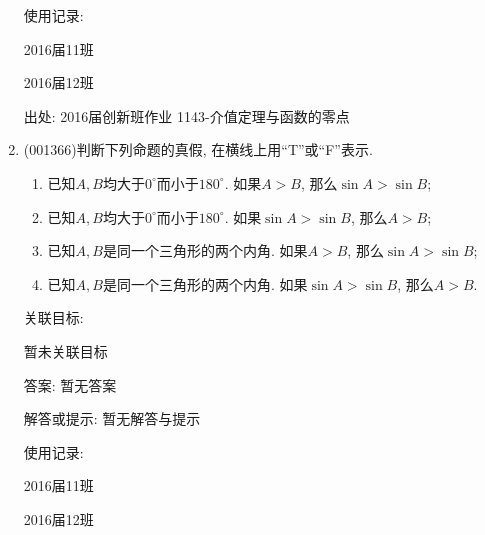 \documentclass[10pt,a4paper]{article}
\newcommand{\blank}[1]{\underline{\hbox to #1pt{}}}
\begin{document}
\begin{enumerate}[1.]
使用记录:

2016届11班		

2016届12班		


出处: 2016届创新班作业	1143-介值定理与函数的零点
\item { (001366)}判断下列命题的真假, 在横线上用``{\rm T}''或``{\rm F}''表示.
\begin{enumerate}[\blank{30}(1)]
\item 已知$A,B$均大于$0^\circ$而小于$180^\circ$. 如果$A>B$, 那么$\sin A>\sin B$;\\ 
\item 已知$A,B$均大于$0^\circ$而小于$180^\circ$. 如果$\sin A>\sin B$, 那么$ A> B$;\\ 
\item 已知$A,B$是同一个三角形的两个内角. 如果$A>B$, 那么$\sin A>\sin B$;\\ 
\item 已知$A,B$是同一个三角形的两个内角. 如果$\sin A>\sin B$, 那么$A>B$.\\ 
\end{enumerate}


关联目标:

暂未关联目标

答案: 暂无答案

解答或提示: 暂无解答与提示

使用记录:

2016届11班				

2016届12班				



\end{enumerate}
\end{document}
